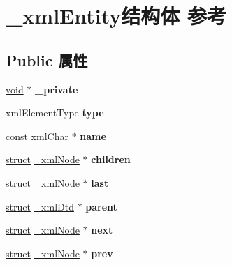\hypertarget{struct__xml_entity}{}\section{\+\_\+xml\+Entity结构体 参考}
\label{struct__xml_entity}
\subsection*{Public 属性}
\begin{DoxyCompactItemize}
\item 
\mbox{\label{struct__xml_entity_a8d8ebc67add6e39cfa504b01499b8747}} 
\hyperlink{interfacevoid}{void} $\ast$ {\bfseries \+\_\+private}
\item 
\mbox{\label{struct__xml_entity_ac3b4e1ec2a9713ed75c05395c925f994}} 
xml\+Element\+Type {\bfseries type}
\item 
\mbox{\label{struct__xml_entity_a81a435176b4605b20a9f9dbb6ad001d9}} 
const xml\+Char $\ast$ {\bfseries name}
\item 
\mbox{\label{struct__xml_entity_a917dfc510417945d25dd2e687157b68d}} 
\hyperlink{interfacestruct}{struct} \hyperlink{struct__xml_node}{\+\_\+xml\+Node} $\ast$ {\bfseries children}
\item 
\mbox{\label{struct__xml_entity_a8c396e1792dc1c14c8187afe40e63f80}} 
\hyperlink{interfacestruct}{struct} \hyperlink{struct__xml_node}{\+\_\+xml\+Node} $\ast$ {\bfseries last}
\item 
\mbox{\label{struct__xml_entity_aad8c155ad98cec309a9a60c03c262d7d}} 
\hyperlink{interfacestruct}{struct} \hyperlink{struct__xml_dtd}{\+\_\+xml\+Dtd} $\ast$ {\bfseries parent}
\item 
\mbox{\label{struct__xml_entity_afef709661a94fe35cd1ae664f536d6b3}} 
\hyperlink{interfacestruct}{struct} \hyperlink{struct__xml_node}{\+\_\+xml\+Node} $\ast$ {\bfseries next}
\item 
\mbox{\label{struct__xml_entity_a4e2e6c655941635a7627957b2fd4ac16}} 
\hyperlink{interfacestruct}{struct} \hyperlink{struct__xml_node}{\+\_\+xml\+Node} $\ast$ {\bfseries prev}

\end{DoxyCompactItemize}
